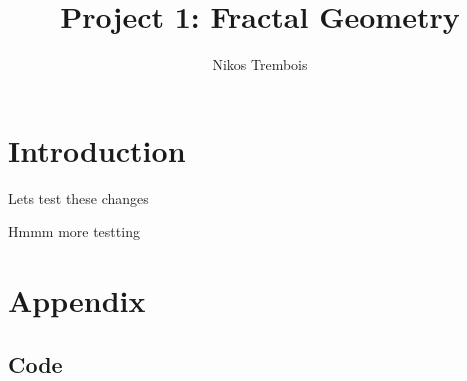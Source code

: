 \documentclass[letterpaper,11pt]{article}
\begin{document}
\title{Project 1: Fractal Geometry}
\author{Nikos Trembois}
\date{}
\maketitle

\newpage

\section{Introduction}
Lets test these changes

Hmmm more testting
\section{Appendix}

\subsection{Code}
\end{document}
